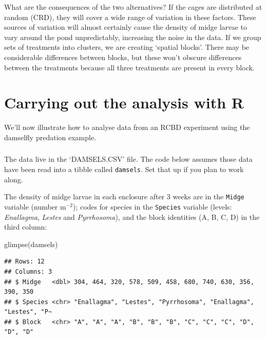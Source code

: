 \documentclass[
]{book}
\newenvironment{Shaded}{\begin{snugshade}}{\end{snugshade}}
\newcommand{\FunctionTok}[1]{\textcolor[rgb]{0.00,0.00,0.00}{#1}}
\newcommand{\NormalTok}[1]{#1}
\newenvironment{greybox}{
  \definecolor{shadecolor}{rgb}{0.95,0.95,0.95}  %
  \color{black}
  \begin{shaded}}
 {\end{shaded}}
\newenvironment{infobox}[1]
  {
  \begin{itemize}
  \renewcommand{\labelitemi}{
    \raisebox{-.7\height}[0pt][0pt]{
      {\setkeys{Gin}{width=3em,keepaspectratio}
        \texttt{[image: images/\#1]}}
    }
  }
  \setlength{\fboxsep}{1em}
  \begin{greybox}
  \item
  }
  {
  \end{greybox}
  \end{itemize}
  }
\begin{document}
What are the consequences of the two alternatives? If the cages are distributed at random (CRD), they will cover a wide range of variation in these factors. These sources of variation will almost certainly cause the density of midge larvae to vary around the pond unpredictably, increasing the noise in the data. If we group sets of treatments into clusters, we are creating `spatial blocks'. There may be considerable differences between blocks, but these won't obscure differences between the treatments because all three treatments are present in every block.

\hypertarget{carrying-out-the-analysis-with-r}{%
\section{Carrying out the analysis with R}\label{carrying-out-the-analysis-with-r}}

We'll now illustrate how to analyse data from an RCBD experiment using the damselfly predation example.

\begin{infobox}{action}

\hypertarget{section-11}{%
\subsubsection*{}\label{section-11}}

The data live in the `DAMSELS.CSV' file. The code below assumes those data have been read into a tibble called \texttt{damsels}. Set that up if you plan to work along.

\end{infobox}

The density of midge larvae in each enclosure after 3 weeks are in the \texttt{Midge} variable (number m\(^{-2}\)); codes for species in the \texttt{Species} variable (levels: \emph{Enallagma}, \emph{Lestes} and \emph{Pyrrhosoma}), and the block identities (A, B, C, D) in the third column:

\begin{Shaded}
\begin{Highlighting}[]
\FunctionTok{glimpse}\NormalTok{(damsels)}
\end{Highlighting}
\end{Shaded}

\begin{verbatim}
## Rows: 12
## Columns: 3
## $ Midge   <dbl> 304, 464, 320, 578, 509, 458, 680, 740, 630, 356, 390, 350
## $ Species <chr> "Enallagma", "Lestes", "Pyrrhosoma", "Enallagma", "Lestes", "P~
## $ Block   <chr> "A", "A", "A", "B", "B", "B", "C", "C", "C", "D", "D", "D"
\end{verbatim}
\end{document}
